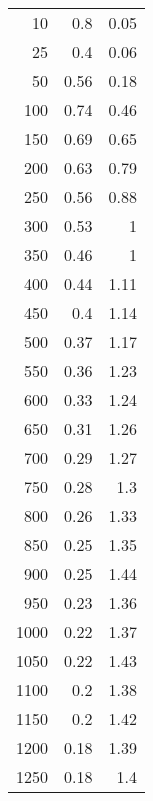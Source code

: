 \begin{tabular}{rrr}
\hline
   10 & 0.8  & 0.05 \\
   25 & 0.4  & 0.06 \\
   50 & 0.56 & 0.18 \\
  100 & 0.74 & 0.46 \\
  150 & 0.69 & 0.65 \\
  200 & 0.63 & 0.79 \\
  250 & 0.56 & 0.88 \\
  300 & 0.53 & 1    \\
  350 & 0.46 & 1    \\
  400 & 0.44 & 1.11 \\
  450 & 0.4  & 1.14 \\
  500 & 0.37 & 1.17 \\
  550 & 0.36 & 1.23 \\
  600 & 0.33 & 1.24 \\
  650 & 0.31 & 1.26 \\
  700 & 0.29 & 1.27 \\
  750 & 0.28 & 1.3  \\
  800 & 0.26 & 1.33 \\
  850 & 0.25 & 1.35 \\
  900 & 0.25 & 1.44 \\
  950 & 0.23 & 1.36 \\
 1000 & 0.22 & 1.37 \\
 1050 & 0.22 & 1.43 \\
 1100 & 0.2  & 1.38 \\
 1150 & 0.2  & 1.42 \\
 1200 & 0.18 & 1.39 \\
 1250 & 0.18 & 1.4  \\
\hline
\end{tabular}